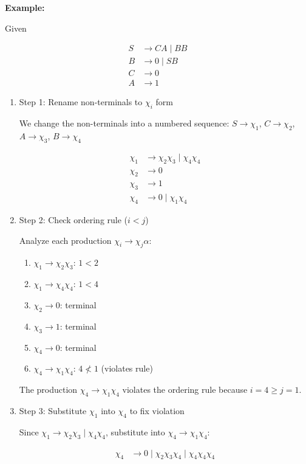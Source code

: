 \documentclass[12pt,a4paper,openany]{article}
\begin{document}
\textbf{Example:} 

Given

\begin{align*}
S &\to CA \mid BB \\
B &\to 0 \mid SB \\
C &\to 0\\
A &\to 1
\end{align*}

\begin{enumerate}
    \item Step 1: Rename non-terminals to $\chi_i$ form
    
    We change the non-terminals into a numbered sequence: $S \to \chi_1$, $C \to \chi_2$, $A \to \chi_3$, $B \to \chi_4$

    \begin{align*}
    \chi_1 &\to \chi_2\chi_3 \mid \chi_4\chi_4 \\
    \chi_2 &\to 0 \\
    \chi_3 &\to 1\\
    \chi_4 &\to 0 \mid \chi_1\chi_4 
    \end{align*}

    \item Step 2: Check ordering rule ($i < j$)
    
    Analyze each production $\chi_i \to \chi_j\alpha$:

    \begin{enumerate}
        \item $\chi_1 \to \chi_2\chi_3$: $1 < 2$ 
        \item $\chi_1 \to \chi_4\chi_4$: $1 < 4$ 
        \item $\chi_2 \to 0$: terminal 
        \item $\chi_3 \to 1$: terminal 
        \item $\chi_4 \to 0$: terminal 
        \item $\chi_4 \to \chi_1\chi_4$: $4 \not< 1$  (violates rule)
    \end{enumerate}
    
    The production $\chi_4 \to \chi_1\chi_4$ violates the ordering rule because $i = 4 \geq j = 1$.

    \item Step 3: Substitute $\chi_1$ into $\chi_4$ to fix violation
    
    Since $\chi_1 \to \chi_2\chi_3 \mid \chi_4\chi_4$, substitute into $\chi_4 \to \chi_1\chi_4$:

    \begin{align*}
    \chi_4 &\to 0 \mid \chi_2\chi_3\chi_4 \mid \chi_4\chi_4\chi_4
    \end{align*}


\end{enumerate}
\end{document}
